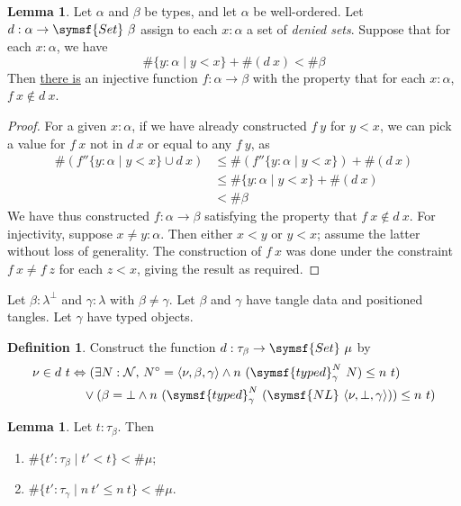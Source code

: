 \documentclass{article}
\newcommand{\clem}[3]{\href{https://leanprover-community.github.io/con-nf/doc/ConNF/#1.html\#ConNF.#2}{#3}}
\theoremstyle{definition}
\newtheorem{definition}{Definition}[section]
\newtheorem{lemma}[theorem]{Lemma}
\theoremstyle{remark}
\begin{document}
\begin{lemma}
    \label{lem:chooseWf}
    Let \( \alpha \) and \( \beta \) be types, and let \( \alpha \) be well-ordered.
    Let \( d : \alpha \to \symsf{Set}\ \beta \) assign to each \( x : \alpha \) a set of \emph{denied sets}.
    Suppose that for each \( x : \alpha \), we have
    \[ \#\{ y : \alpha \mid y < x \} + \#(d\ x) < \#\beta \]
    Then \clem{Fuzz/Construction}{chooseWf}{there is} an injective function \( f : \alpha \to \beta \) with the property that for each \( x : \alpha \), \( f\ x \not\in d\ x \).
\end{lemma}
\begin{proof}
    For a given \( x : \alpha \), if we have already constructed \( f\ y \) for \( y < x \), we can pick a value for \( f\ x \) not in \( d\ x \) or equal to any \( f\ y \), as
    \begin{align*}
        \#(f '' \{ y : \alpha \mid y < x \} \cup d\ x) &\leq \#(f '' \{ y : \alpha \mid y < x \}) + \#(d\ x) \\
        &\leq \#\{ y : \alpha \mid y < x \} + \#(d\ x) \\
        &< \#\beta
    \end{align*}
    We have thus constructed \( f : \alpha \to \beta \) satisfying the property that \( f\ x \not\in d\ x \).
    For injectivity, suppose \( x \neq y : \alpha \).
    Then either \( x < y \) or \( y < x \); assume the latter without loss of generality.
    The construction of \( f\ x \) was done under the constraint \( f\ x \neq f\ z \) for each \( z < x \), giving the result as required.
\end{proof}
Let \( \beta : \lambda^\bot \) and \( \gamma : \lambda \) with \( \beta \neq \gamma \).
Let \( \beta \) and \( \gamma \) have tangle data and positioned tangles.
Let \( \gamma \) have typed objects.
\begin{definition}
    \label{def:fuzz_deny}
    Construct the function \( d : \tau_\beta \to \symsf{Set}\ \mu \) by
    \begin{align*}
        \nu \in d\ t &\Leftrightarrow (\exists N : \mathcal N,\, N^\circ = \langle \nu, \beta, \gamma \rangle \wedge n\ (\symsf{typed}^N_\gamma\ N) \leq n\ t) \\
        &\quad\vee (\beta = \bot \wedge n\ (\symsf{typed}^N_\gamma\ (\symsf{NL}\ \langle \nu, \bot, \gamma \rangle)) \leq n\ t)
    \end{align*}
\end{definition}
\begin{lemma}
    \label{lem:mk_invImage_lt_le}
    Let \( t : \tau_\beta \).
    Then
    \begin{enumerate}
        \item \( \#\{ t' : \tau_\beta \mid t' < t \} < \#\mu \);
        \item \( \#\{ t' : \tau_\gamma \mid n\ t' \leq n\ t \} < \#\mu \).
    \end{enumerate}
\end{lemma}
\end{document}
